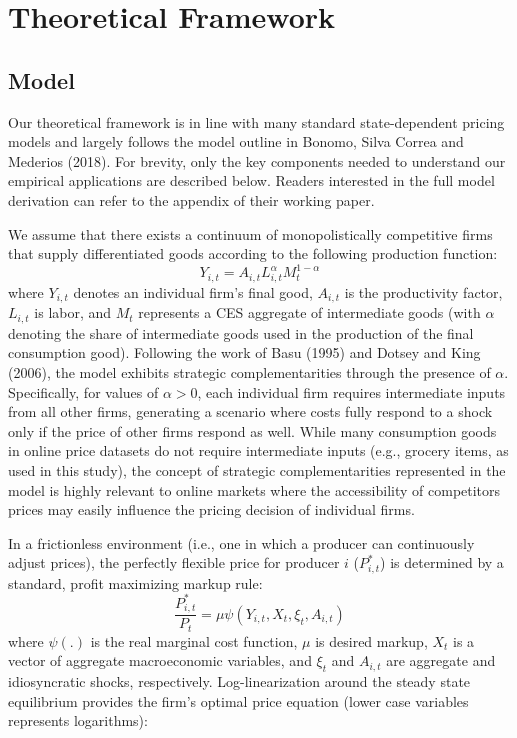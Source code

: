 \documentclass[11pt]{article}
\begin{document}
\section{Theoretical Framework}
\subsection{Model}

Our theoretical framework is in line with many standard state-dependent pricing models and largely follows the model outline in Bonomo, Silva Correa and Mederios (2018). For brevity, only the key components needed to understand our empirical applications are described below. Readers interested in the full model derivation can refer to the appendix of their working paper.  

We assume that there exists a continuum of monopolistically competitive firms that supply differentiated goods according to the following production function: 
%
$$Y_{i,t} = A_{i,t}L^{\alpha}_{i,t}M^{1-\alpha}_{t}$$
%
where $Y_{i,t}$ denotes an individual firm's final good, $A_{i,t}$ is the productivity factor, $L_{i,t}$ is labor, and $M_{t}$ represents a CES aggregate of intermediate goods (with $\alpha$ denoting the share of intermediate goods used in the production of the final consumption good). Following the work of Basu (1995) and Dotsey and King (2006), the model exhibits strategic complementarities through the presence of $\alpha$. Specifically, for values of $\alpha > 0$, each individual firm requires intermediate inputs from all other firms, generating a scenario where costs fully respond to a shock only if the price of other firms respond as well. While many consumption goods in online price datasets do not require intermediate inputs (e.g., grocery items, as used in this study), the concept of strategic complementarities represented in the model is highly relevant to online markets where the accessibility of competitors prices may easily influence the pricing decision of individual firms. 

In a frictionless environment (i.e., one in which a producer can continuously adjust prices), the perfectly flexible price for producer $i$ ($P^{*}_{i,t}$) is determined by a standard, profit maximizing markup rule:
%
\begin{equation} \label{eq:1} \frac{P^{*}_{i,t}}{P_{t}} = \mu \psi(Y_{i,t}, X_{t}, \xi_{t}, A_{i,t})
\end{equation}
%
where $\psi(.)$ is the real marginal cost function, $\mu$ is desired markup, $X_{t}$ is a vector of aggregate macroeconomic variables, and $\xi_{t}$ and $A_{i,t}$ are aggregate and idiosyncratic shocks, respectively. Log-linearization around the steady state equilibrium provides the firm's optimal price equation (lower case variables represents logarithms):
\end{document}
